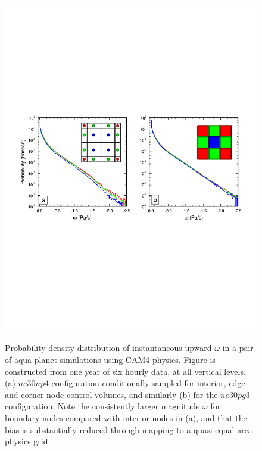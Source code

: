 \documentclass[twocol]{ametsoc}
\begin{document}
\begin{figure}[t]
\begin{center}
\noindent\includegraphics[width=37pc,angle=0]{figs/temp_pdf_omg_np4_v_pg3_CROP.pdf}\\
\end{center}
\caption{Probability density distribution of instantaneous upward $\omega$ in a pair of aqua-planet simulations using CAM4 physics. Figure is constructed from one year of six hourly data, at all vertical levels. (a) $ne30np4$ configuration conditionally sampled for interior, edge and corner node control volumes, and similarly (b) for the $ne30pg3$ configuration. Note the consistently larger magnitude $\omega$ for boundary nodes compared with interior nodes in (a), and that the bias is substantially reduced through mapping to a quasi-equal area physics grid.}\label{fig:omega-se-volumes}
\end{figure}
\end{document}
